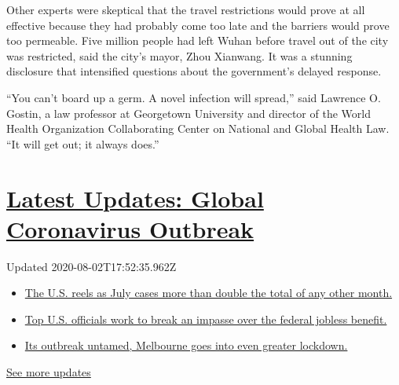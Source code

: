 Other experts were skeptical that the travel restrictions would prove at
all effective because they had probably come too late and the barriers
would prove too permeable. Five million people had left Wuhan before
travel out of the city was restricted, said the city's mayor, Zhou
Xianwang. It was a stunning disclosure that intensified questions about
the government's delayed response.

``You can't board up a germ. A novel infection will spread,'' said
Lawrence O. Gostin, a law professor at Georgetown University and
director of the World Health Organization Collaborating Center on
National and Global Health Law. ``It will get out; it always does.''

\hypertarget{latest-updates-global-coronavirus-outbreak}{%
\section{\texorpdfstring{\href{https://www.nytimes.com/2020/08/01/world/coronavirus-covid-19.html?action=click\&pgtype=Article\&state=default\&region=MAIN_CONTENT_1\&context=storylines_live_updates}{Latest
Updates: Global Coronavirus
Outbreak}}{Latest Updates: Global Coronavirus Outbreak}}\label{latest-updates-global-coronavirus-outbreak}}

Updated 2020-08-02T17:52:35.962Z

\begin{itemize}
\tightlist
\item
  \href{https://www.nytimes.com/2020/08/01/world/coronavirus-covid-19.html?action=click\&pgtype=Article\&state=default\&region=MAIN_CONTENT_1\&context=storylines_live_updates\#link-34047410}{The
  U.S. reels as July cases more than double the total of any other
  month.}
\item
  \href{https://www.nytimes.com/2020/08/01/world/coronavirus-covid-19.html?action=click\&pgtype=Article\&state=default\&region=MAIN_CONTENT_1\&context=storylines_live_updates\#link-780ec966}{Top
  U.S. officials work to break an impasse over the federal jobless
  benefit.}
\item
  \href{https://www.nytimes.com/2020/08/01/world/coronavirus-covid-19.html?action=click\&pgtype=Article\&state=default\&region=MAIN_CONTENT_1\&context=storylines_live_updates\#link-2bc8948}{Its
  outbreak untamed, Melbourne goes into even greater lockdown.}
\end{itemize}

\href{https://www.nytimes.com/2020/08/01/world/coronavirus-covid-19.html?action=click\&pgtype=Article\&state=default\&region=MAIN_CONTENT_1\&context=storylines_live_updates}{See
more updates}

